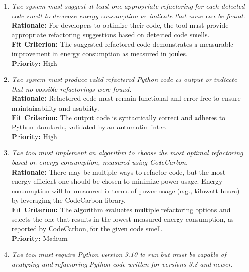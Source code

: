 \documentclass[12pt]{article}
\begin{document}
\begin{enumerate}[label=FR \arabic*., wide=0pt, leftmargin=*]
    {\bf Rationale:} Verifying that the refactored code preserves functionality requires the use of the original test suite.\\
    {\bf Fit Criterion:} Users can specify a path to their test suite that the tool recognizes and utilizes for testing the refactored code.\\
    {\bf Priority:} High
    \item \emph{The system must suggest at least one appropriate refactoring for each detected code smell to decrease energy consumption or indicate that none can be found.}\\[2mm]
    {\bf Rationale:} For developers to optimize their code, the tool must provide appropriate refactoring suggestions based on detected code smells.\\
    {\bf Fit Criterion:} The suggested refactored code demonstrates a measurable improvement in energy consumption as measured in joules.\\
    {\bf Priority:} High
    \item \emph{The system must produce valid refactored Python code as output or indicate that no possible refactorings were found.}\\[2mm]
    {\bf Rationale:} Refactored code must remain functional and error-free to ensure maintainability and usability.\\
    {\bf Fit Criterion:} The output code is syntactically correct and adheres to Python standards, validated by an automatic linter.\\
    {\bf Priority:} High
    \item \emph{The tool must implement an algorithm to choose the most optimal refactoring based on energy consumption, measured using CodeCarbon.}\\[2mm]
    {\bf Rationale:} There may be multiple ways to refactor code, but the most energy-efficient one should be chosen to minimize power usage. Energy consumption will be measured in terms of power usage (e.g., kilowatt-hours) by leveraging the CodeCarbon library.\\
    {\bf Fit Criterion:} The algorithm evaluates multiple refactoring options and selects the one that results in the lowest measured energy consumption, as reported by CodeCarbon, for the given code smell.\\
    {\bf Priority:} Medium
    \item \emph{The tool must require Python version 3.10 to run but must be capable of analyzing and refactoring Python code written for versions 3.8 and newer.}\\[2mm]

\end{enumerate}
\end{document}
